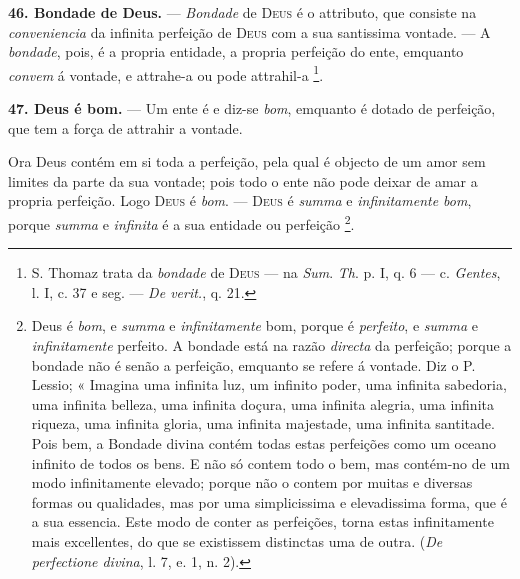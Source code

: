 \textbf{46. Bondade de Deus.} --- \emph{Bondade} de \textsc{Deus} é o attributo, que consiste na \emph{conveniencia} da infinita perfeição de \textsc{Deus} com a sua santissima vontade. --- A \emph{bondade}, pois, é a propria entidade, a propria perfeição do ente, emquanto \emph{convem} á vontade, e attrahe-a ou pode attrahil-a \footnote{S. Thomaz trata da \emph{bondade} de \textsc{Deus} --- na \emph{Sum}. \emph{Th}. p. I, q. 6 --- c. \emph{Gentes}, l. I, c. 37 e seg. --- \emph{De verit.}, q. 21.}.

\textbf{47. Deus é bom.} --- Um ente é e diz-se \emph{bom}, emquanto é dotado de perfeição, que tem a força de attrahir a vontade.

 Ora Deus contém em si toda a perfeição, pela qual é objecto de um amor sem limites da parte da sua vontade; pois todo o ente não pode deixar de amar a propria perfeição. Logo \textsc{Deus} é \emph{bom}. --- \textsc{Deus} é \emph{summa} e \emph{infinitamente bom}, porque \emph{summa} e \emph{infinita} é a sua entidade ou perfeição \footnote{Deus é \emph{bom}, e \emph{summa} e \emph{infinitamente} bom, porque é \emph{perfeito}, e \emph{summa} e \emph{infinitamente} perfeito. A bondade está na razão \emph{directa} da perfeição; porque a bondade não é senão a perfeição, emquanto se refere á vontade. Diz o P. Lessio; « Imagina uma infinita luz, um infinito poder, uma infinita sabedoria, uma infinita belleza, uma infinita doçura, uma infinita alegria, uma infinita riqueza, uma infinita gloria, uma infinita majestade, uma infinita santitade. Pois bem, a Bondade divina contém todas estas perfeições como um oceano infinito de todos os bens. E não só contem todo o bem, mas contém-no de um modo infinitamente elevado; porque não o contem por muitas e diversas formas ou qualidades, mas por uma simplicissima e elevadissima forma, que é a sua essencia. Este modo de conter as perfeições, torna estas infinitamente mais excellentes, do que se existissem distinctas uma de outra. (\emph{De perfectione divina}, l. 7, e. 1, n. 2).}.


